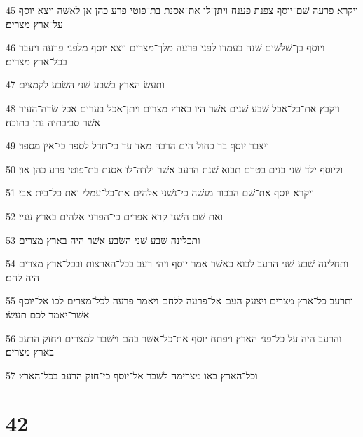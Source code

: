 \par 45 ויקרא פרעה שׁם־יוסף צפנת פענח ויתן־לו את־אסנת בת־פוטי פרע כהן אן לאשׁה ויצא יוסף על־ארץ מצרים׃
\par 46 ויוסף בן־שׁלשׁים שׁנה בעמדו לפני פרעה מלך־מצרים ויצא יוסף מלפני פרעה ויעבר בכל־ארץ מצרים׃
\par 47 ותעשׂ הארץ בשׁבע שׁני השׂבע לקמצים׃
\par 48 ויקבץ את־כל־אכל שׁבע שׁנים אשׁר היו בארץ מצרים ויתן־אכל בערים אכל שׂדה־העיר אשׁר סביבתיה נתן בתוכה׃
\par 49 ויצבר יוסף בר כחול הים הרבה מאד עד כי־חדל לספר כי־אין מספר׃
\par 50 וליוסף ילד שׁני בנים בטרם תבוא שׁנת הרעב אשׁר ילדה־לו אסנת בת־פוטי פרע כהן און׃
\par 51 ויקרא יוסף את־שׁם הבכור מנשׁה כי־נשׁני אלהים את־כל־עמלי ואת כל־בית אבי׃
\par 52 ואת שׁם השׁני קרא אפרים כי־הפרני אלהים בארץ עניי׃
\par 53 ותכלינה שׁבע שׁני השׂבע אשׁר היה בארץ מצרים׃
\par 54 ותחלינה שׁבע שׁני הרעב לבוא כאשׁר אמר יוסף ויהי רעב בכל־הארצות ובכל־ארץ מצרים היה לחם׃
\par 55 ותרעב כל־ארץ מצרים ויצעק העם אל־פרעה ללחם ויאמר פרעה לכל־מצרים לכו אל־יוסף אשׁר־יאמר לכם תעשׂו׃
\par 56 והרעב היה על כל־פני הארץ ויפתח יוסף את־כל־אשׁר בהם וישׁבר למצרים ויחזק הרעב בארץ מצרים׃
\par 57 וכל־הארץ באו מצרימה לשׁבר אל־יוסף כי־חזק הרעב בכל־הארץ׃

\chapter{42}

